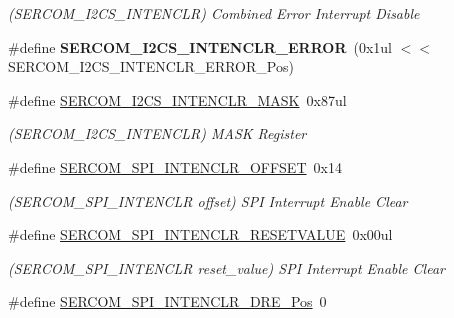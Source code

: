 \begin{DoxyCompactItemize}
\begin{DoxyCompactList}\small\item\em (S\+E\+R\+C\+O\+M\+\_\+\+I2\+C\+S\+\_\+\+I\+N\+T\+E\+N\+C\+L\+R) Combined Error Interrupt Disable \end{DoxyCompactList}\item 
\hypertarget{group___s_a_m_l21___s_e_r_c_o_m_ga227b55e9a4dac1b000819081a1acbfec}{}\#define {\bfseries S\+E\+R\+C\+O\+M\+\_\+\+I2\+C\+S\+\_\+\+I\+N\+T\+E\+N\+C\+L\+R\+\_\+\+E\+R\+R\+O\+R}~(0x1ul $<$$<$ S\+E\+R\+C\+O\+M\+\_\+\+I2\+C\+S\+\_\+\+I\+N\+T\+E\+N\+C\+L\+R\+\_\+\+E\+R\+R\+O\+R\+\_\+\+Pos)\label{group___s_a_m_l21___s_e_r_c_o_m_ga227b55e9a4dac1b000819081a1acbfec}

\item 
\hypertarget{group___s_a_m_l21___s_e_r_c_o_m_ga171e1777d0d29bd4813c69a835f7527c}{}\#define \hyperlink{group___s_a_m_l21___s_e_r_c_o_m_ga171e1777d0d29bd4813c69a835f7527c}{S\+E\+R\+C\+O\+M\+\_\+\+I2\+C\+S\+\_\+\+I\+N\+T\+E\+N\+C\+L\+R\+\_\+\+M\+A\+S\+K}~0x87ul\label{group___s_a_m_l21___s_e_r_c_o_m_ga171e1777d0d29bd4813c69a835f7527c}

\begin{DoxyCompactList}\small\item\em (S\+E\+R\+C\+O\+M\+\_\+\+I2\+C\+S\+\_\+\+I\+N\+T\+E\+N\+C\+L\+R) M\+A\+S\+K Register \end{DoxyCompactList}\item 
\hypertarget{group___s_a_m_l21___s_e_r_c_o_m_ga9f209578a343cc342f3b213acdd05c21}{}\#define \hyperlink{group___s_a_m_l21___s_e_r_c_o_m_ga9f209578a343cc342f3b213acdd05c21}{S\+E\+R\+C\+O\+M\+\_\+\+S\+P\+I\+\_\+\+I\+N\+T\+E\+N\+C\+L\+R\+\_\+\+O\+F\+F\+S\+E\+T}~0x14\label{group___s_a_m_l21___s_e_r_c_o_m_ga9f209578a343cc342f3b213acdd05c21}

\begin{DoxyCompactList}\small\item\em (S\+E\+R\+C\+O\+M\+\_\+\+S\+P\+I\+\_\+\+I\+N\+T\+E\+N\+C\+L\+R offset) S\+P\+I Interrupt Enable Clear \end{DoxyCompactList}\item 
\hypertarget{group___s_a_m_l21___s_e_r_c_o_m_ga549ba58f077670109c9527a1aafbeffb}{}\#define \hyperlink{group___s_a_m_l21___s_e_r_c_o_m_ga549ba58f077670109c9527a1aafbeffb}{S\+E\+R\+C\+O\+M\+\_\+\+S\+P\+I\+\_\+\+I\+N\+T\+E\+N\+C\+L\+R\+\_\+\+R\+E\+S\+E\+T\+V\+A\+L\+U\+E}~0x00ul\label{group___s_a_m_l21___s_e_r_c_o_m_ga549ba58f077670109c9527a1aafbeffb}

\begin{DoxyCompactList}\small\item\em (S\+E\+R\+C\+O\+M\+\_\+\+S\+P\+I\+\_\+\+I\+N\+T\+E\+N\+C\+L\+R reset\+\_\+value) S\+P\+I Interrupt Enable Clear \end{DoxyCompactList}\item 
\hypertarget{group___s_a_m_l21___s_e_r_c_o_m_ga3f6bbb3397a69c132ed66390cd016d0d}{}\#define \hyperlink{group___s_a_m_l21___s_e_r_c_o_m_ga3f6bbb3397a69c132ed66390cd016d0d}{S\+E\+R\+C\+O\+M\+\_\+\+S\+P\+I\+\_\+\+I\+N\+T\+E\+N\+C\+L\+R\+\_\+\+D\+R\+E\+\_\+\+Pos}~0\label{group___s_a_m_l21___s_e_r_c_o_m_ga3f6bbb3397a69c132ed66390cd016d0d}


\end{DoxyCompactItemize}
